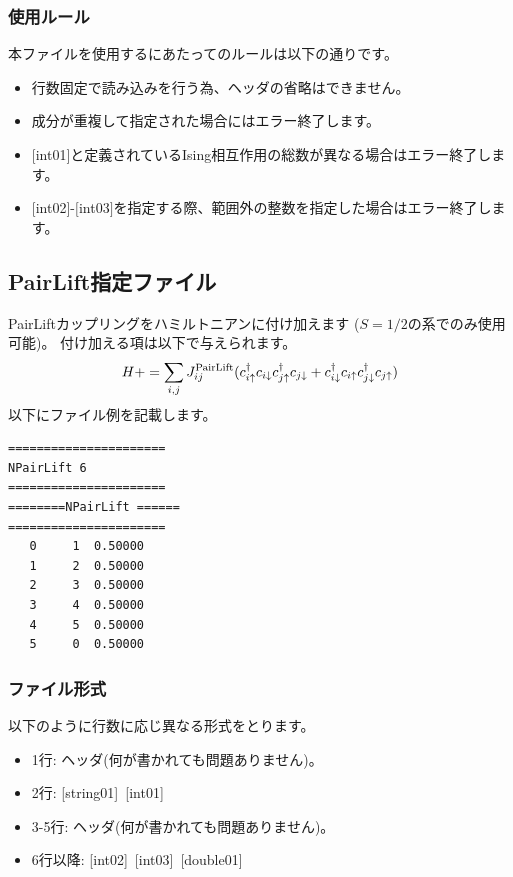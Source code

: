 \subsubsection{使用ルール}
本ファイルを使用するにあたってのルールは以下の通りです。
\begin{itemize}
\item 行数固定で読み込みを行う為、ヘッダの省略はできません。
\item 成分が重複して指定された場合にはエラー終了します。
\item $[$int01$]$と定義されているIsing相互作用の総数が異なる場合はエラー終了します。
\item $[$int02$]$-$[$int03$]$を指定する際、範囲外の整数を指定した場合はエラー終了します。
\end{itemize}

\newpage
\subsection{PairLift指定ファイル}
\label{Subsec:pairlift}
PairLiftカップリングをハミルトニアンに付け加えます{ ($S=1/2$の系でのみ使用可能)}。
付け加える項は以下で与えられます。
\begin{equation}
H+=\sum_{i,j}J_{ij}^{\rm PairLift} (c_ {i \uparrow}^{\dag}c_{i\downarrow}c_{j \uparrow}^{\dag}c_{j \downarrow}+c_ {i \downarrow}^{\dag}c_{i\uparrow}c_{j \downarrow}^{\dag}c_{j \uparrow})
\end{equation}
以下にファイル例を記載します。

\begin{minipage}{12.5cm}
\begin{screen}
\begin{verbatim}
====================== 
NPairLift 6  
====================== 
========NPairLift ====== 
====================== 
   0     1  0.50000
   1     2  0.50000
   2     3  0.50000
   3     4  0.50000
   4     5  0.50000
   5     0  0.50000
\end{verbatim}
\end{screen}
\end{minipage}

\subsubsection{ファイル形式}
以下のように行数に応じ異なる形式をとります。
 \begin{itemize}
   \item  1行:  ヘッダ(何が書かれても問題ありません)。
   \item  2行:   [string01]~[int01]
   \item  3-5行:  ヘッダ(何が書かれても問題ありません)。
   \item  6行以降:
   [int02]~[int03]~[double01] 
  \end{itemize}
